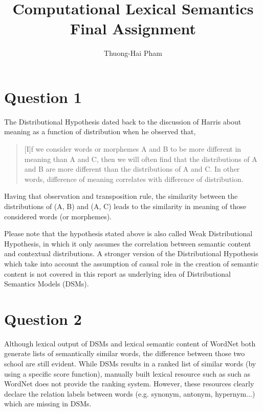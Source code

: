 \documentclass[]{article}
\title{Computational Lexical Semantics \\Final Assignment}
\author{Thuong-Hai Pham}
\begin{document}
\maketitle

\section{Question 1}

The Distributional Hypothesis dated back to the discussion of Harris \cite{harris1954distributional} about meaning as a function of distribution when he observed that,
\blockquote{[I]f we consider words or
	morphemes A and B to be more different in meaning than A and C, then we will
	often find that the distributions of A and B are more different than the distributions of A and C. In other words, difference of meaning correlates with difference
	of distribution.}
Having that observation and transposition rule, the similarity between the distributions of (A, B) and (A, C) leads to the similarity in meaning of those considered words (or morphemes).

Please note that the hypothesis stated above is also called Weak Distributional Hypothesis, in which it only assumes the correlation between semantic content and contextual distributions. A stronger version of the Distributional Hypothesis which take into account the assumption of causal role in the creation of semantic content is not covered in this report as underlying idea of Distributional Semantics Models (DSMs).

\section{Question 2}
Although lexical output of DSMs and lexical semantic content of WordNet both generate lists of semantically similar words, the difference between those two school are still evident. While DSMs results in a ranked list of similar words (by using a specific score function), manually built lexical resource such as such as WordNet does not provide the ranking system. However, these resources clearly declare the relation labels between words (e.g. synonym, antonym, hypernym...) which are missing in DSMs.
\end{document}
